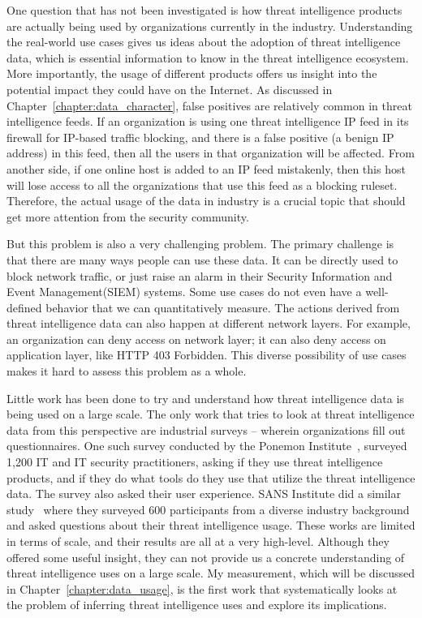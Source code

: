 One question that has not been investigated is how threat intelligence 
products are actually being used by organizations currently in the industry.
Understanding the real-world use cases gives us ideas about the adoption of threat
intelligence data, which is essential information to know in the threat
intelligence ecosystem. More importantly, the usage of different products offers
us insight into the potential impact they could have on the Internet. As 
discussed in Chapter~\ref{chapter:data_character}, false positives are relatively 
common in threat intelligence feeds. If an organization is using one threat
intelligence IP feed in its firewall for IP-based traffic blocking, and there
is a false positive (a benign IP address) in this feed, then all the users in
that organization will be affected. From another side, if one online host is
added to an IP feed mistakenly, then this host will lose access to all the
organizations that use this feed as a blocking ruleset. Therefore, the actual
usage of the data in industry is a crucial topic that should get more attention
from the security community.

But this problem is also a very challenging problem. The primary challenge 
is that there are many ways people can use these data. It can be directly 
used to block network traffic, or just raise an alarm in their Security
Information and Event Management(SIEM) systems. Some use cases do not even 
have a well-defined behavior that we can quantitatively measure. 
The actions derived from threat intelligence data can also happen at different
network layers. For example, an organization can deny access on network layer; 
it can also deny access on application layer, like HTTP 403 Forbidden. 
This diverse possibility of use cases makes it hard to assess this problem as 
a whole. 

Little work has been done to try and understand how threat
intelligence data is being used on a large scale. The only work that tries to
look at threat intelligence data from this perspective are industrial surveys
-- wherein organizations fill out questionnaires. One such survey conducted by
the Ponemon Institute~\cite{ponemon2018cti}, surveyed 1,200 IT and IT
security practitioners, asking if they use threat intelligence products, and
if they do what tools do they use that utilize the threat intelligence data.
The survey also asked their user experience. SANS Institute did a
similar study~\cite{shackleford2017cyber} where they surveyed 600
participants from a diverse industry background and asked questions about
their threat intelligence usage. These works are limited in terms
of scale, and their results are all at a very high-level. Although they offered
some useful insight, they can not provide us a concrete understanding
of threat intelligence uses on a large scale. My measurement,
which will be discussed in Chapter~\ref{chapter:data_usage},
is the first work that systematically looks at the problem of inferring
threat intelligence uses and explore its implications.

